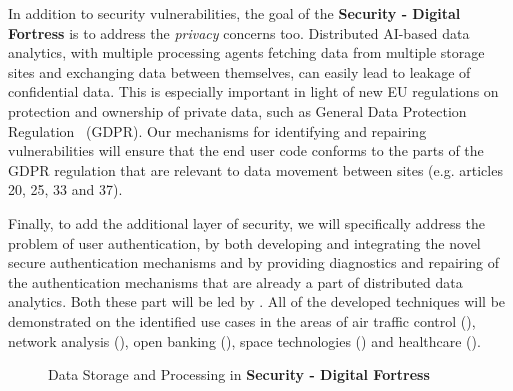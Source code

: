 \documentclass[a4paper,11pt]{article}
\newcommand{\project}[1]{\textbf{#1}\xspace}
\newcommand{\SECURITY}{\project{Security - Digital Fortress}}
\newcommand{\TheProject}{\SECURITY}
\begin{document}
In addition to security vulnerabilities, the goal of the \TheProject{} is to address the \emph{privacy} concerns too. Distributed AI-based data analytics, with multiple processing agents fetching data from multiple storage sites and exchanging data between themselves, can easily lead to leakage of confidential data. This is especially important in light of new EU regulations on protection and ownership of private data, such as General Data Protection Regulation~\cite{gdpr} (GDPR). Our mechanisms for identifying and repairing vulnerabilities will ensure that the end user code conforms to the parts of the GDPR regulation that are relevant to data movement between sites (e.g. articles 20, 25, 33 and 37). 

Finally, to add the additional layer of security, we will specifically address the problem of user authentication, by both developing and integrating the novel secure authentication mechanisms and by providing diagnostics and repairing of the authentication mechanisms that are already a part of distributed data analytics. Both these part will be led by \COGNIshort{}. All of the developed techniques will be demonstrated on the identified use cases in the areas of air traffic control (\FRQshort{}), network analysis (\DEMshort{}), open banking (\SOPRAshort{}), space technologies (\SOPRAshort{}) and healthcare (\SOPRAshort{}). 


\begin{figure}[tp]
  \begin{center}
  \vspace{-5mm}
  \vspace{-1.5cm}
  \caption{Data Storage and Processing in \TheProject{}}
  \label{fig:storageprocessing}
  \end{center}
  \end{figure}
\end{document}
